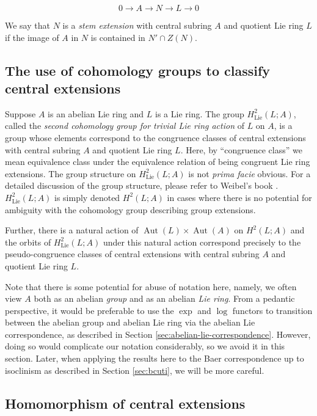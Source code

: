 $$0 \to A \to N \to L \to 0$$

We say that $N$ is a {\em stem extension} with central subring $A$
and quotient Lie ring $L$ if the image of $A$ in $N$ is contained in $N'
\cap Z(N)$.

\subsection{The use of cohomology groups to classify central extensions}\label{sec:second-cohomology-lie-ring-classify-extensions}

Suppose $A$ is an abelian Lie ring and $L$ is a Lie ring. The group
$H^2_{\text{Lie}}(L;A)$, called the {\em second cohomology group for
  trivial Lie ring action} of $L$ on $A$, is a group whose elements
correspond to the congruence classes of central extensions with
central subring $A$ and quotient Lie ring $L$. Here, by ``congruence
class'' we mean equivalence class under the equivalence relation of
being congruent Lie ring extensions. The group structure on
$H^2_{\text{Lie}}(L;A)$ is not {\em prima facie} obvious. For a detailed discussion of the group structure, please refer to Weibel's book \cite{Weibel}.
$H^2_{\text{Lie}}(L;A)$ is simply denoted $H^2(L;A)$ in cases where
there is no potential for ambiguity with the cohomology group
describing group extensions.

Further, there is a natural action of $\operatorname{Aut}(L) \times
\operatorname{Aut}(A)$ on $H^2(L;A)$ and the orbits of
$H^2_{\text{Lie}}(L;A)$ under this natural action correspond precisely
to the pseudo-congruence classes of central extensions with central
subring $A$ and quotient Lie ring $L$.

Note that there is some potential for abuse of notation here, namely,
we often view $A$ both as an abelian {\em group} and as an abelian
{\em Lie ring}. From a pedantic perspective, it would be preferable to
use the $\exp$ and $\log$ functors to transition between the abelian
group and abelian Lie ring via the abelian Lie correspondence, as
described in Section \ref{sec:abelian-lie-correspondence}. However,
doing so would complicate our notation considerably, so we avoid it in
this section. Later, when applying the results here to the Baer
correspondence up to isoclinism as described in Section
\ref{sec:bcuti}, we will be more careful.

\subsection{Homomorphism of central extensions}\label{sec:homomorphism-central-extensions-lie}


